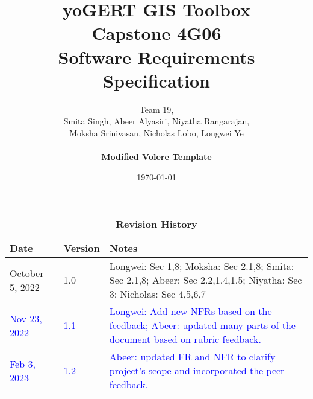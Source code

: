\documentclass[12pt, titlepage]{article}
\title{\textbf{yoGERT GIS Toolbox}\\ Capstone 4G06\\ Software Requirements Specification}
\author{Team 19,
		\\ Smita Singh, Abeer Alyasiri, Niyatha Rangarajan,\\ Moksha Srinivasan, Nicholas Lobo, Longwei Ye \\\\
		\textbf{Modified Volere Template}
}
\date{\today}
\begin{document}
\nocite{*}
\maketitle

\tableofcontents
\listoftables
\listoffigures

\begin{table}[H]
\caption{\bf Revision History}
\begin{tabularx}{\textwidth}{p{3cm}p{2cm}X}
\toprule {\bf Date} & {\bf Version} & {\bf Notes}\\
\midrule
October 5, 2022 & 1.0 & Longwei: Sec 1,8; Moksha: Sec 2.1,8; Smita: Sec 2.1,8; Abeer: Sec 2.2,1.4,1.5; Niyatha: Sec 3; Nicholas: Sec 4,5,6,7 \\
\textcolor{blue}{Nov 23, 2022} & \textcolor{blue}{1.1} & \textcolor{blue}{Longwei: Add new NFRs based on the feedback; Abeer: updated many parts of the document based on rubric feedback.}\\
\textcolor{blue}{Feb 3, 2023} & \textcolor{blue}{1.2} & \textcolor{blue}{Abeer: updated FR and NFR to clarify project's scope and incorporated the peer feedback.}\\
\bottomrule
\end{tabularx}
\end{table}

\newpage


\end{document}
